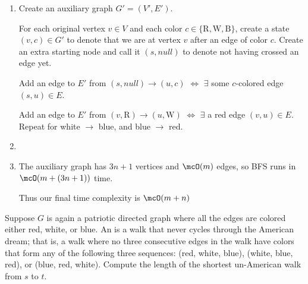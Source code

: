 \documentclass{article}
\begin{document}
\begin{solution}

\begin{enumerate}[label=(\alph*)]
  \item Create an auxiliary graph $G'=(V',E')$.

  For each original vertex $v\in V$ and each color $c \in \{\text{R},\text{W},\text{B}\}$, create a state $(v,c) \in G'$ to denote that we are at vertex $ v $ after an edge of color $ c $.
  Create an extra starting node and call it $(s, null)$ to denote not having crossed an edge yet.

  Add an edge to $ E' $ from $(s,null) \to (u,c)$ $ \iff $ $ \exists $ some $c$-colored edge $(s,u)\in E$.

  Add an edge to $ E' $ from $(v,\mathrm{R}) \to (u,\mathrm{W})$ $ \iff $ $ \exists $ a red edge $(v, u)\in E$. Repeat for white $ \to $ blue, and blue $ \to $ red.

  \item {}
  \item The auxiliary graph has $3n + 1$ vertices and $\mcO(m)$ edges, so BFS runs in $ \mcO(m+(3n+1)) $ time.

  Thus our final time complexity is $ \mcO(m+n) $
\end{enumerate}
\end{solution}
\pagebreak

\begin{subexercise} %
  Suppose $ G $ is again a patriotic directed graph where all the edges are colored either red, white, or blue.
  An  is a walk that never cycles through the American dream; that is, a walk where no three consecutive edges in the walk have colors that form any of the following three sequences: (red, white, blue), (white, blue, red), or (blue, red, white).
  Compute the length of the shortest un-American walk from $ s $ to $ t $.
\end{subexercise}
\end{document}

